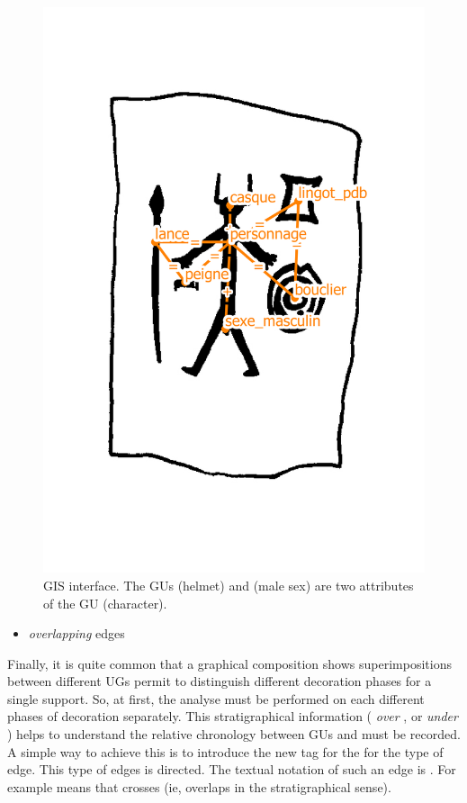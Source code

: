 \documentclass[article]{jss}\usepackage{knitr}
\begin{document}
\begin{figure}[H] 
\centering
\includegraphics[scale=0.15]{gis_1}
\caption{\label{fig:gis1} GIS interface. The GUs  (helmet) and  (male sex) are two attributes of the GU  (character).}
\end{figure}

\begin{itemize}
  \item \emph{overlapping} edges
\end{itemize}

Finally, it is quite common that a graphical composition shows superimpositions between different UGs permit to distinguish different decoration phases for a single support. So, at first, the analyse must be performed on each different phases of decoration separately. This stratigraphical information ( \emph{over} , or  \emph{under} ) helps to understand the relative chronology between GUs and must be recorded. A simple way to achieve this is to introduce the new tag  for the for the type of edge. This type of edges is directed. The textual notation of such an edge is . For example  means that  crosses  (ie,  overlaps  in the stratigraphical sense).
\end{document}
